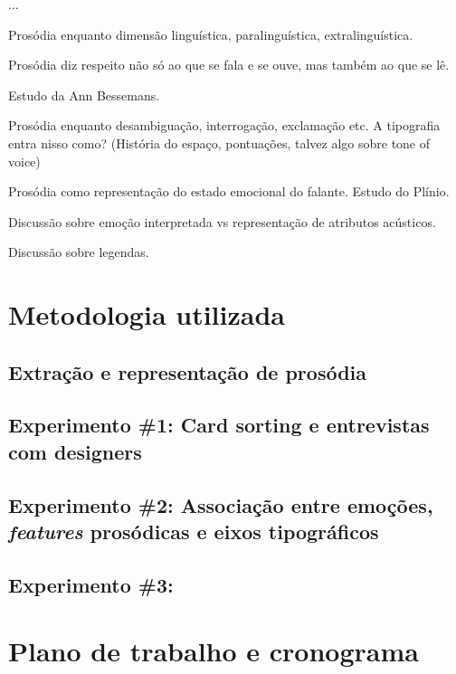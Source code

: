 \documentclass{tufte-handout}
\begin{document}
\cite{seidenberg2017}




...

Prosódia enquanto dimensão linguística, paralinguística, extralinguística.

Prosódia diz respeito não só ao que se fala e se ouve, mas também ao que se lê.

Estudo da Ann Bessemans.

Prosódia enquanto desambiguação, interrogação, exclamação etc. A tipografia entra nisso como? (História do espaço, pontuações, talvez algo sobre tone of voice)

Prosódia como representação do estado emocional do falante. Estudo do Plínio.

Discussão sobre emoção interpretada vs representação de atributos acústicos.

Discussão sobre legendas.

\section{Metodologia utilizada}\label{sec:metodologia}

\subsection{Extração e representação de prosódia}\label{sec:met_extract_represent}

\subsection{Experimento \#1: Card sorting e entrevistas com designers}\label{sec:met_exp_2}

\subsection{Experimento \#2: Associação entre emoções, \textit{features} prosódicas e eixos tipográficos}\label{sec:met_exp_2}

\subsection{Experimento \#3: }\label{sec:met_exp_2}

\section{Plano de trabalho e cronograma}\label{sec:plano_de_trabalho}
\end{document}
